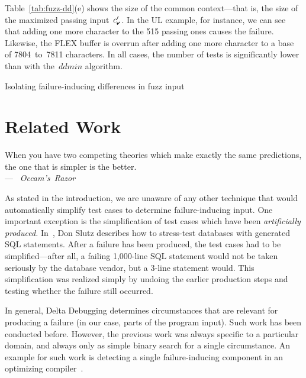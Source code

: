 \documentclass{acm_proc_article-sp}
\newcommand{\FLEX}       {{\small FLEX}\xspace}
\newcommand{\SQL}        {{\small SQL}\xspace}
\newcommand{\UL}         {{\small UL}\xspace}
\newcommand{\PASS}{\text{\ding{52}}\xspace}
\newcommand{\dpass}{{c'_{\scriptscriptstyle \PASS}}}
\newcommand{\ddmin}{\textit{ddmin}\xspace}
\newenvironment{Quote}{%
\smallskip
\begin{minipage}[t]{\columnwidth}
\begin{flushright}%
\itshape%
\samepage%
}{\end{flushright}\end{minipage}\par}
\newcommand{\By}[2]{\\[1mm]---~\mbox{\textnormal{#1}} \mbox{\textsl{#2}}}
\theoremstyle{plain}
\begin{document}
Table~\ref{tab:fuzz-dd}(e) shows the size of the common context---that
is, the size of the maximized passing input~$\dpass$.  In the \UL
example, for instance, we can see that adding one more character to
the 515 passing ones causes the failure.  Likewise, the \FLEX buffer
is overrun after adding one more character to a base of 7804~to~7811
characters.  In all cases, the number of tests is significantly lower
than with the~$\ddmin$ algorithm.

\begin{table*}[t]
\begin{center}
\let\f=\footnotesize

\end{center}
\vspace{-0.25cm}
\caption{Isolating failure-inducing differences in fuzz input}
\label{tab:fuzz-dd}
\end{table*}



\section{Related Work}
\label{sec:related-work}

\begin{Quote}
When you have two competing theories which make exactly the same predictions,
the one that is simpler is the better.
\By{}{Occam's Razor}
\end{Quote}

As stated in the introduction, we are unaware of any other technique
that would automatically simplify test cases to determine
failure-inducing input.  One important exception is the simplification
of test cases which have been \emph{artificially produced.}
In~\cite{slutz/98/vldb}, Don Slutz describes how to stress-test
databases with generated \SQL statements.  After a failure has been
produced, the test cases had to be simplified---after all, a failing
1,000-line \SQL statement would not be taken seriously by the database
vendor, but a 3-line statement would.  This simplification was
realized simply by undoing the earlier production steps and testing
whether the failure still occurred.

In general, Delta Debugging determines circumstances that are relevant
for producing a failure (in our case, parts of the program input).
Such work has been conducted before.  However, the previous work was
always specific to a particular domain, and always only as simple
binary search for a single circumstance.  An example for such work is
detecting a single failure-inducing component in an optimizing
compiler~\cite{whalley/94/toplas}.
\end{document}
